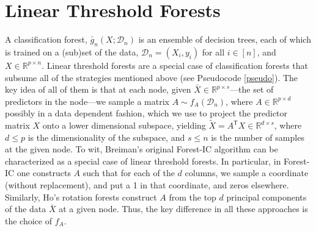 \documentclass{article} %
\newcommand{\jovo}[1]{{\color{magenta}{\it jovo says: #1}}}
\newcommand{\Real}{\mathbb{R}}
\providecommand{\mc}[1]{\mathcal{#1}}
\providecommand{\mt}[1]{\widetilde{#1}}
\newcommand{\T}{^{\ensuremath{\mathsf{T}}}}           %
\begin{document}


\section{Linear Threshold Forests}

A classification forest, $\bar{g}_n(X; \mc{D}_n)$ is an ensemble of decision trees, each of which is trained on a (sub)set of the data, $\mc{D}_n=(X_i,y_i)$ for all $i \in [n]$, and $X \in \Real^{p \times n}$. Linear threshold forests are a special case of classification forests that subsume all of the strategies mentioned above (see Pseudocode \ref{pseudo}).  The key idea of all of them is that at each node, given $\bar{X} \in \Real^{p \times s}$---the set of predictors in the node---we sample a  matrix $A \sim f_A(\mc{D}_n)$, where $A \in \Real^{p \times d}$ possibly in a data dependent fashion, which we use to project the predictor matrix $X$ onto a lower dimensional subspace, yielding $\mt{X} = A\T X \in \Real^{d \times s}$, where $d \leq p$ is the dimensionality of the subspace, and $s \leq n$ is the number of samples at the given node.  To wit, Breiman's original Forest-IC algorithm can be characterized as a special case of linear threshold forests.  In particular, in Forest-IC one constructs $A$ such that for each of the $d$ columns, we sample a coordinate (without replacement), and put a 1 in that coordinate, and zeros elsewhere. Similarly, Ho's rotation forests construct $A$ from the top $d$ principal components of the data $\bar{X}$ at a given node.  Thus, the key difference in all these approaches is the choice of $f_A$. 
\end{document}
